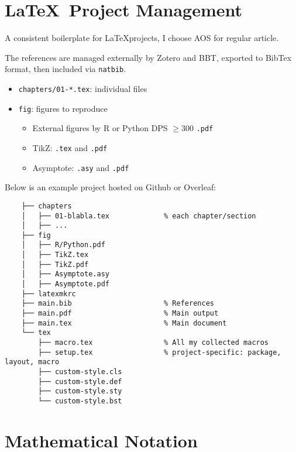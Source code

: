 \newpage


\section{\LaTeX\ Project Management}

A consistent boilerplate for \LaTeX projects,
I choose AOS for regular article.

The references are managed externally by Zotero and BBT,
exported to BibTex format,
then included via \verb|natbib|.

\begin{itemize}
    \item \verb|chapters/01-*.tex|: individual files
    \item \verb|fig|: figures to reproduce
          \begin{itemize}
              \item External figures by \textsf{R} or Python DPS $\geq 300$ \texttt{.pdf}
              \item TikZ: \texttt{.tex} and \texttt{.pdf}
              \item Asymptote: \texttt{.asy} and \texttt{.pdf}
          \end{itemize}
\end{itemize}

Below is an example project hosted on Github or Overleaf:

\begin{Verbatim}
    ├── chapters
    │   ├── 01-blabla.tex             % each chapter/section
    │   ├── ...
    ├── fig
    │   ├── R/Python.pdf
    │   ├── TikZ.tex
    │   ├── TikZ.pdf
    │   ├── Asymptote.asy
    │   ├── Asymptote.pdf
    ├── latexmkrc
    ├── main.bib                      % References
    ├── main.pdf                      % Main output
    ├── main.tex                      % Main document
    └── tex
        ├── macro.tex                 % All my collected macros
        ├── setup.tex                 % project-specific: package, layout, macro
        ├── custom-style.cls
        ├── custom-style.def
        ├── custom-style.sty
        └── custom-style.bst
\end{Verbatim}

\newpage

\section{Mathematical Notation}

